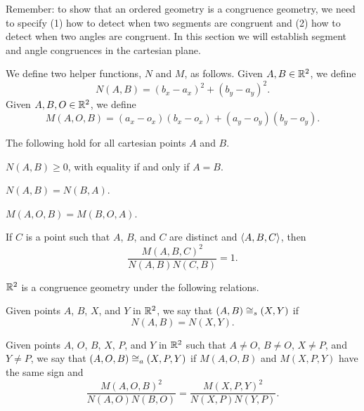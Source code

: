 Remember: to show that an ordered geometry is a congruence geometry, we need to specify (1) how to detect when two segments are congruent and (2) how to detect when two angles are congruent.
In this section we will establish segment and angle congruences in the cartesian plane.

We define two helper functions, \(N\) and \(M\), as follows.
Given \(A,B \in \mathbb{R}^2\), we define \[ N(A,B) = (b_x - a_x)^2 + (b_y - a_y)^2. \]
Given \(A,B,O \in \mathbb{R}^2\), we define \[ M(A,O,B) = (a_x - o_x)(b_x - o_x) + (a_y - o_y)(b_y - o_y). \]

\begin{prop}\label{prop:rr2-cong-helper}
The following hold for all cartesian points \(A\) and \(B\).
\begin{proplist}
\item \label{prop:rr2-cong-helper:zero} \(N(A,B) \geq 0\), with equality if and only if \(A = B\).
\item \label{prop:rr2-cong-helper:sym} \(N(A,B) = N(B,A)\).
\item \(M(A,O,B) = M(B,O,A)\).
\item If \(C\) is a point such that \(A\), \(B\), and \(C\) are distinct and \(\langle A, B, C \rangle\), then \[ \frac{M(A,B,C)^2}{N(A,B)N(C,B)} = 1. \]
\end{proplist}
\end{prop}

\begin{prop}
\(\mathbb{R}^2\) is a congruence geometry under the following relations.
\begin{proplist}
\item Given points \(A\), \(B\), \(X\), and \(Y\) in \(\mathbb{R}^2\), we say that \((A,B) \cong_s (X,Y)\) if \[ N(A,B) = N(X,Y). \]
\item Given points \(A\), \(O\), \(B\), \(X\), \(P\), and \(Y\) in \(\mathbb{R}^2\) such that \(A \neq O\), \(B \neq O\), \(X \neq P\), and \(Y \neq P\), we say that \((A,O,B) \cong_a (X,P,Y)\) if \(M(A,O,B)\) and \(M(X,P,Y)\) have the same sign and \[ \frac{M(A,O,B)^2}{N(A,O)N(B,O)} = \frac{M(X,P,Y)^2}{N(X,P)N(Y,P)}. \]
\end{proplist}
\end{prop}

